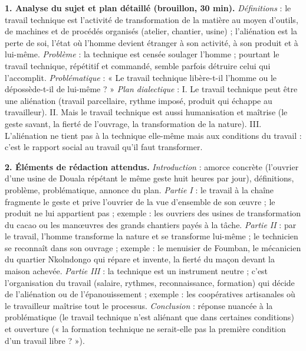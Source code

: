 \documentclass[11pt]{article}
\begin{document}
\begin{corrige}
\textbf{1. Analyse du sujet et plan détaillé (brouillon, 30 min).}
\emph{Définitions} : le travail technique est l'activité de transformation de la matière au moyen d'outils, de machines et de procédés organisés (atelier, chantier, usine) ; l'aliénation est la perte de soi, l'état où l'homme devient étranger à son activité, à son produit et à lui-même. \emph{Problème} : la technique est censée soulager l'homme ; pourtant le travail technique, répétitif et commandé, semble parfois détruire celui qui l'accomplit. \emph{Problématique} : « Le travail technique libère-t-il l'homme ou le dépossède-t-il de lui-même ? »
\emph{Plan dialectique} : I. Le travail technique peut être une aliénation (travail parcellaire, rythme imposé, produit qui échappe au travailleur). II. Mais le travail technique est aussi humanisation et maîtrise (le geste savant, la fierté de l'ouvrage, la transformation de la nature). III. L'aliénation ne tient pas à la technique elle-même mais aux conditions du travail : c'est le rapport social au travail qu'il faut transformer.

\textbf{2. Éléments de rédaction attendus.}
\emph{Introduction} : amorce concrète (l'ouvrier d'une usine de Douala répétant le même geste huit heures par jour), définitions, problème, problématique, annonce du plan. \emph{Partie I} : le travail à la chaîne fragmente le geste et prive l'ouvrier de la vue d'ensemble de son œuvre ; le produit ne lui appartient pas ; exemple : les ouvriers des usines de transformation du cacao ou les manœuvres des grands chantiers payés à la tâche. \emph{Partie II} : par le travail, l'homme transforme la nature et se transforme lui-même ; le technicien se reconnaît dans son ouvrage ; exemple : le menuisier de Foumban, le mécanicien du quartier Nkolndongo qui répare et invente, la fierté du maçon devant la maison achevée. \emph{Partie III} : la technique est un instrument neutre ; c'est l'organisation du travail (salaire, rythmes, reconnaissance, formation) qui décide de l'aliénation ou de l'épanouissement ; exemple : les coopératives artisanales où le travailleur maîtrise tout le processus. \emph{Conclusion} : réponse nuancée à la problématique (le travail technique n'est aliénant que dans certaines conditions) et ouverture (« la formation technique ne serait-elle pas la première condition d'un travail libre ? »).


\end{corrige}
\end{document}
